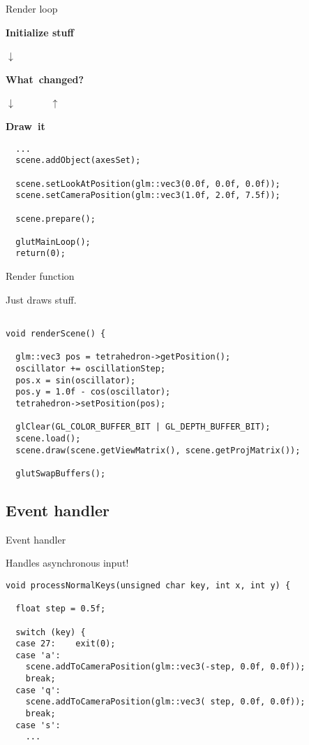 \documentclass[12pt]{article}
\begin{document}
\begin{frame}[fragile]{Render loop}
\begin{center}
\begin{minipage}{0.5\columnwidth}

\hfill{\bfseries Initialize stuff}\hfill~

\hfill\hbox{$\downarrow$ ~~~~~~~}\hfill~

\hfill\hbox{\bfseries What changed?}\hfill~

\hfill\hbox{$\downarrow$ ~~~~~ $\uparrow$}\hfill~

\hfill\hbox{\bfseries Draw it}\hfill~
\end{minipage}
\end{center}


\begin{verbatim}
  ...
  scene.addObject(axesSet);

  scene.setLookAtPosition(glm::vec3(0.0f, 0.0f, 0.0f));
  scene.setCameraPosition(glm::vec3(1.0f, 2.0f, 7.5f));

  scene.prepare();

  glutMainLoop();
  return(0);
\end{verbatim}
\end{frame}

\begin{frame}[fragile]{Render function}

Just draws stuff.

\begin{verbatim}

void renderScene() {

  glm::vec3 pos = tetrahedron->getPosition();
  oscillator += oscillationStep;
  pos.x = sin(oscillator);
  pos.y = 1.0f - cos(oscillator);
  tetrahedron->setPosition(pos);

  glClear(GL_COLOR_BUFFER_BIT | GL_DEPTH_BUFFER_BIT);
  scene.load();
  scene.draw(scene.getViewMatrix(), scene.getProjMatrix());

  glutSwapBuffers();
\end{verbatim}
\end{frame}


\subsection{Event handler}

\begin{frame}[fragile]{Event handler}

Handles asynchronous input!

\begin{verbatim}
void processNormalKeys(unsigned char key, int x, int y) {

  float step = 0.5f;

  switch (key) {
  case 27:    exit(0);
  case 'a':
    scene.addToCameraPosition(glm::vec3(-step, 0.0f, 0.0f));
    break;
  case 'q':
    scene.addToCameraPosition(glm::vec3( step, 0.0f, 0.0f));
    break;
  case 's':
    ...
\end{verbatim}
\end{frame}
\end{document}
